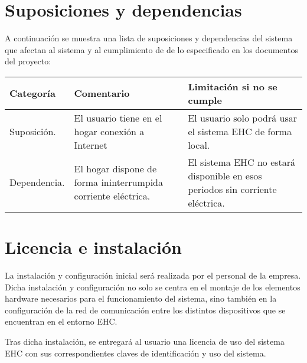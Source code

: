 \section{Suposiciones y dependencias}
    A continuación se muestra una lista de suposiciones y dependencias del sistema que afectan al sistema y al cumplimiento de de lo especificado en los documentos del proyecto: \\ \par
    \begin{tabular}{|p{4cm}|p{6cm}|p{6cm}|}
        \hline \textbf{Categoría} &  \textbf{Comentario} & \textbf{Limitación si no se cumple} \\
        \hline Suposición. & El usuario tiene en el hogar conexión a Internet & El usuario solo podrá usar el sistema  EHC de forma local. \\
        \hline Dependencia. & El hogar dispone de forma ininterrumpida corriente eléctrica. & El sistema EHC no estará disponible en esos periodos sin corriente eléctrica. \\
        \hline
    \end{tabular}


\section{Licencia e instalación}
    La instalación y configuración inicial será realizada por el personal de la empresa. Dicha instalación y configuración no solo se centra en el montaje de los elementos hardware necesarios para el funcionamiento del sistema, sino también en la configuración de la red de comunicación entre los distintos dispositivos que se encuentran en el entorno EHC. \par

    Tras dicha instalación, se entregará al usuario una licencia de uso del sistema EHC con sus correspondientes claves de identificación y uso del sistema.
